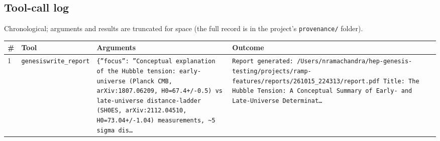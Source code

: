 \documentclass[11pt,a4paper]{article}
\begin{document}
\subsection{Tool-call log}
Chronological; arguments and results are truncated for space (the full record is in the project's \texttt{provenance/} folder).
\begin{longtable}{@{}p{}p{}p{}p{}@{}}
\toprule \# & Tool & Arguments & Outcome \\ \midrule \endhead
1 & \texttt{genesis}\newline\texttt{write\_\allowbreak{}report} & \texttt{\{''focus'':\allowbreak{} ''Conceptual explanation of the Hubble tension:\allowbreak{} early-universe (Planck CMB,\allowbreak{} arXiv:\allowbreak{}1807.06209,\allowbreak{} H0=\allowbreak{}67.4+/\allowbreak{}-0.5)\allowbreak{} vs late-universe distance-ladder (SH0ES,\allowbreak{} arXiv:\allowbreak{}2112.04510,\allowbreak{} H0=\allowbreak{}73.04+/\allowbreak{}-1.04)\allowbreak{} measurements,\allowbreak{} \textasciitilde{}\allowbreak{}5 sigma dis\ldots{}\allowbreak{}} & \texttt{Report generated:\allowbreak{} /\allowbreak{}Users/\allowbreak{}nramachandra/\allowbreak{}hep-genesis-testing/\allowbreak{}projects/\allowbreak{}ramp-features/\allowbreak{}reports/\allowbreak{}261015\_\allowbreak{}224313/\allowbreak{}report.pdf Title:\allowbreak{} The Hubble Tension:\allowbreak{} A Conceptual Summary of Early- and Late-Universe Determinat\ldots{}\allowbreak{}} \\
\bottomrule\end{longtable}
\end{document}

